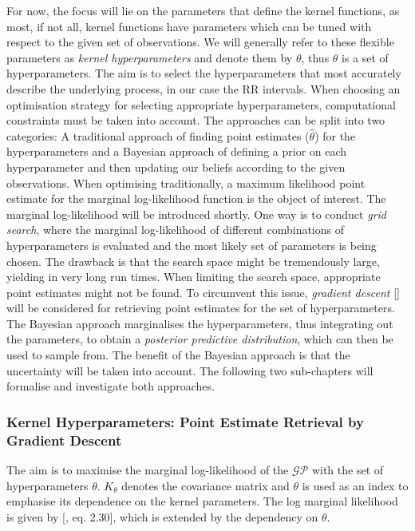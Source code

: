 \documentclass[11pt]{scrartcl}
\begin{document}
For now, the focus will lie on the parameters that define the kernel functions, as most, if not all, kernel functions have parameters which can be tuned with respect to the given set of observations. We will generally refer to these flexible parameters as \textit{kernel hyperparameters} and denote them by $\theta$, thus $\theta$ is a set of hyperparameters. The aim is to select the hyperparameters that most accurately describe the underlying process, in our case the RR intervals. When choosing an optimisation strategy for selecting appropriate hyperparameters, computational constraints must be taken into account. The approaches can be split into two categories: A traditional approach of finding point estimates ($\hat{\theta}$) for the hyperparameters and a Bayesian approach of defining a prior on each hyperparameter and then updating our beliefs according to the given observations. When optimising traditionally, a maximum likelihood point estimate for the marginal log-likelihood function is the object of interest. The marginal log-likelihood will be introduced shortly. One way is to conduct \textit{grid search}, where the marginal log-likelihood of different combinations of hyperparameters is evaluated and the most likely set of parameters is being chosen. The drawback is that the search space might be tremendously large, yielding in very long run times. When limiting the search space, appropriate point estimates might not be found. To circumvent this issue, \textit{gradient descent} [\cite{gradientdescent}] will be considered for retrieving point estimates for the set of hyperparameters. The Bayesian approach marginalises the hyperparameters, thus integrating out the parameters, to obtain a \textit{posterior predictive distribution}, which can then be used to sample from. The benefit of the Bayesian approach is that the uncertainty will be taken into account. The following two sub-chapters will formalise and investigate both approaches.

\subsubsection{Kernel Hyperparameters: Point Estimate Retrieval by Gradient Descent} \hfill

The aim is to maximise the marginal log-likelihood of the $\mathcal{GP}$ with the set of hyperparameters $\theta$. $K_\theta$ denotes the covariance matrix and $\theta$ is used as an index to emphasise its dependence on the kernel parameters. The log marginal likelihood is given by [\cite{10.5555/1162254}, eq. 2.30], which is extended by the dependency on $\theta$.
\end{document}
